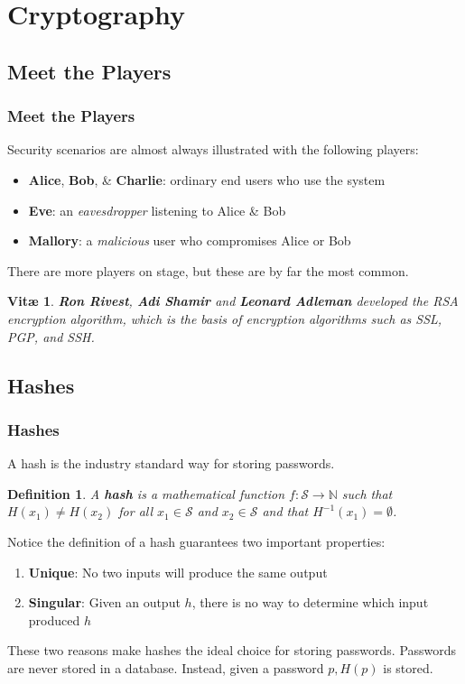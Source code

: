 \documentclass[aspectratio=169]{beamer}
\newtheorem{defn}{Definition}
\newtheorem{vita}{Vit\ae}
\begin{document}
\section{Cryptography}
\subsection{Meet the Players}
\begin{frame}
\frametitle{Meet the Players}
Security scenarios are almost always illustrated with the following players:
\begin{itemize}
	\item \textbf{Alice}, \textbf{Bob}, \& \textbf{Charlie}: ordinary end users who use the system
	\item \textbf{Eve}: an \emph{eavesdropper} listening to Alice \& Bob
	\item \textbf{Mallory}: a \emph{malicious} user who compromises Alice or Bob
\end{itemize}

There are more players on stage, but these are by far the most common.
\pause
\begin{vita}
\textbf{Ron Rivest}, \textbf{Adi Shamir} and \textbf{Leonard Adleman} developed the RSA encryption algorithm, which is the basis of encryption algorithms such as SSL, PGP, and SSH.
\end{vita}
\end{frame}

\subsection{Hashes}
\begin{frame}
\frametitle{Hashes}
A hash is the industry standard way for storing passwords.
\begin{defn}
A \textbf{hash} is a mathematical function $f: \mathcal{S} \rightarrow \mathbb{N}$ such that $H(x_1) \ne H(x_2)$ for all $x_1 \in \mathcal{S}$ and $x_2 \in \mathcal{S}$ and that $H^{-1}(x_1) = \emptyset$.
\end{defn}
Notice the definition of a hash guarantees two important properties:
\begin{enumerate}
	\item \textbf{Unique}: No two inputs will produce the same output
	\item \textbf{Singular}: Given an output $h$, there is no way to determine which input produced $h$
\end{enumerate}
These two reasons make hashes the ideal choice for storing passwords. Passwords are never stored in a database. Instead, given a password $p, H(p)$ is stored.
\end{frame}
\end{document}
